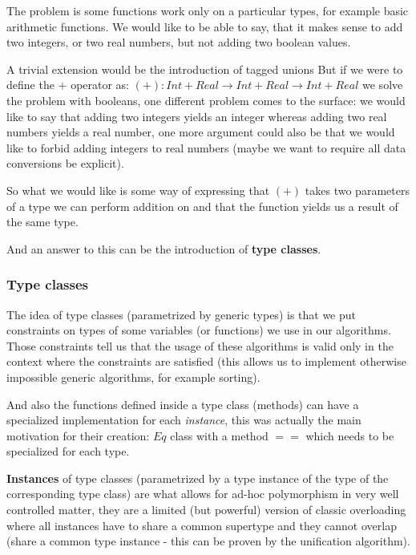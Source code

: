 The problem is some functions work only on a particular types, for example basic arithmetic functions. We would like to be able to say, that it makes sense to add two integers, or two real numbers, but not adding two boolean values.

A trivial extension would be the introduction of tagged unions %
But if we were to define the $+$ operator as: $(+) : Int + Real \rightarrow Int + Real \rightarrow Int + Real$ we solve the problem with booleans, one different problem comes to the surface: we would like to say that adding two integers yields an integer whereas adding two real numbers yields a real number, one more argument could also be that we would like to forbid adding integers to real numbers (maybe we want to require all data conversions be explicit).

So what we would like is some way of expressing that $(+)$ takes two parameters of a type we can perform addition on and that the function yields us a result of the same type.

And an answer to this can be the introduction of \textbf{type classes}.

\subsubsection{Type classes}

The idea of type classes (parametrized by generic types) is that we put constraints on types of some variables (or functions) we use in our algorithms. Those constraints tell us that the usage of these algorithms is valid only in the context where the constraints are satisfied (this allows us to implement otherwise impossible generic algorithms, for example sorting).

And also the functions defined inside a type class (methods) can have a specialized implementation for each \emph{instance}, this was actually the main motivation for their creation: $Eq$ class with a method $==$ which needs to be specialized for each type. %

\textbf{Instances} of type classes (parametrized by a type instance of the type of the corresponding type class) are what allows for ad-hoc polymorphism %
in very well controlled matter, they are a limited (but powerful) version of classic overloading where all instances have to share a common supertype and they cannot overlap (share a common type instance - this can be proven by the unification algorithm).

